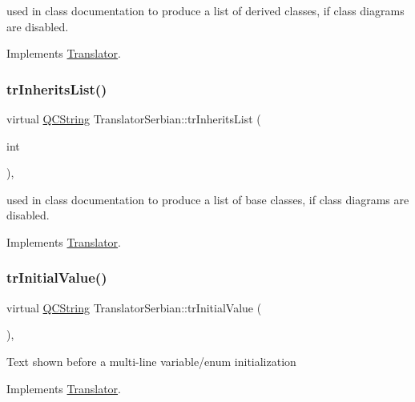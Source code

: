 used in class documentation to produce a list of derived classes, if class diagrams are disabled. 

Implements \mbox{\hyperlink{class_translator}{Translator}}.

\mbox{\label{class_translator_serbian_ab27718cda7872ab5e36b0f0fcdc4e2a0}} 
\subsubsection{\texorpdfstring{trInheritsList()}{trInheritsList()}}
{\footnotesize\ttfamily virtual \mbox{\hyperlink{class_q_c_string}{Q\+C\+String}} Translator\+Serbian\+::tr\+Inherits\+List (\begin{DoxyParamCaption}\item[{int}]{ }\end{DoxyParamCaption})\hspace{0.3cm}{\ttfamily [inline]}, {\ttfamily [virtual]}}

used in class documentation to produce a list of base classes, if class diagrams are disabled. 

Implements \mbox{\hyperlink{class_translator}{Translator}}.

\mbox{\label{class_translator_serbian_a65bb2a1ebec186e011d69de752e30f15}} 
\subsubsection{\texorpdfstring{trInitialValue()}{trInitialValue()}}
{\footnotesize\ttfamily virtual \mbox{\hyperlink{class_q_c_string}{Q\+C\+String}} Translator\+Serbian\+::tr\+Initial\+Value (\begin{DoxyParamCaption}{ }\end{DoxyParamCaption})\hspace{0.3cm}{\ttfamily [inline]}, {\ttfamily [virtual]}}

Text shown before a multi-\/line variable/enum initialization 

Implements \mbox{\hyperlink{class_translator}{Translator}}.

\mbox{\label{class_translator_serbian_ac9100d9227ed8ecd0262a0dc415bcd8a}} 
